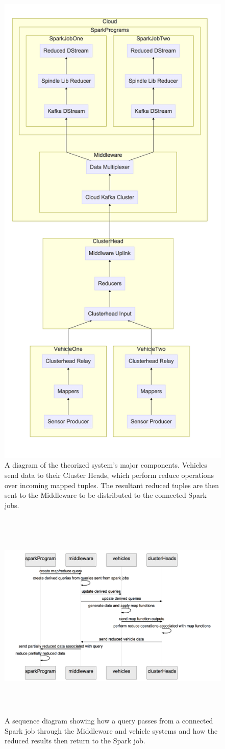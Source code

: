 \documentclass{thesis}
\begin{document}
    \begin{figure}
        \centering
        \includegraphics[width=0.5\linewidth]{binImages/theoretical-system.png}
        \caption{A diagram of the theorized system's major components. Vehicles
        send data to their Cluster Heads, which perform reduce operations over
        incoming mapped tuples. The resultant reduced tuples are then sent to
        the Middleware to be distributed to the connected Spark jobs.}
        \label{fig:theoretical:component}
    \end{figure}
    \begin{figure}
        \centering
        \includegraphics[height=4in, width=6in]{binImages/theoretical-sequence.png}
        \caption{A sequence diagram showing how a query passes from a connected Spark job
        through the Middleware and vehicle systems and how the reduced results then return
        to the Spark job.}
        \label{fig:theoretical:sequence}
    \end{figure}
\end{document}
